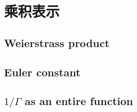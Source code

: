 \section{乘积表示}
\label{b3:sec:2103}


\subsection{Weierstrass product}
\label{b3:subsec:210301}

\subsection{Euler constant}
\label{b3:subsec:210302}

\subsection{\texorpdfstring{\(1/\Gamma\)}{1/Γ} as an entire function}
\label{b3:subsec:210303}


